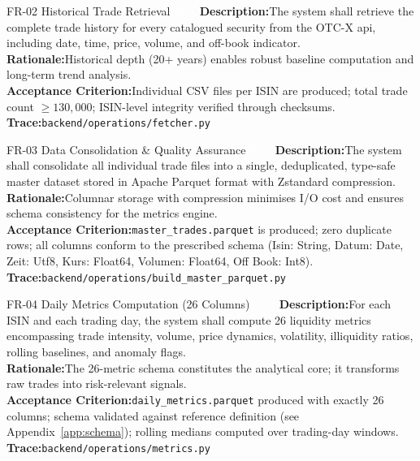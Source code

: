 \documentclass[
  11pt,
  a4paper,
  twoside,
  openany
]{report}
\begin{document}
\vspace{6pt}

\begin{requirement}{FR-02 \;\textbar\; Historical Trade Retrieval\hfill\textcolor{white}{Must}}
\textbf{Description:}\;The system shall retrieve the complete trade history for every catalogued security from the OTC-X \gls{api}, including date, time, price, volume, and off-book indicator.\\[4pt]
\textbf{Rationale:}\;Historical depth (20+ years) enables robust baseline computation and long-term trend analysis.\\[4pt]
\textbf{Acceptance Criterion:}\;Individual CSV files per ISIN are produced; total trade count $\geq 130{,}000$; ISIN-level integrity verified through checksums.\\[4pt]
\textbf{Trace:}\;\texttt{backend/operations/fetcher.py}
\end{requirement}

\vspace{6pt}

\begin{requirement}{FR-03 \;\textbar\; Data Consolidation \& Quality Assurance\hfill\textcolor{white}{Must}}
\textbf{Description:}\;The system shall consolidate all individual trade files into a single, deduplicated, type-safe master dataset stored in Apache Parquet format with Zstandard compression.\\[4pt]
\textbf{Rationale:}\;Columnar storage with compression minimises I/O cost and ensures schema consistency for the metrics engine.\\[4pt]
\textbf{Acceptance Criterion:}\;\texttt{master\_trades.parquet} is produced; zero duplicate rows; all columns conform to the prescribed schema (Isin: String, Datum: Date, Zeit: Utf8, Kurs: Float64, Volumen: Float64, Off Book: Int8).\\[4pt]
\textbf{Trace:}\;\texttt{backend/operations/build\_master\_parquet.py}
\end{requirement}

\vspace{6pt}

\begin{requirement}{FR-04 \;\textbar\; Daily Metrics Computation (26 Columns)\hfill\textcolor{white}{Must}}
\textbf{Description:}\;For each ISIN and each trading day, the system shall compute 26 liquidity metrics encompassing trade intensity, volume, price dynamics, volatility, illiquidity ratios, rolling baselines, and anomaly flags.\\[4pt]
\textbf{Rationale:}\;The 26-metric schema constitutes the analytical core; it transforms raw trades into risk-relevant signals.\\[4pt]
\textbf{Acceptance Criterion:}\;\texttt{daily\_metrics.parquet} produced with exactly 26 columns; schema validated against reference definition (see Appendix~\ref{app:schema}); rolling medians computed over trading-day windows.\\[4pt]
\textbf{Trace:}\;\texttt{backend/operations/metrics.py}
\end{requirement}
\end{document}
